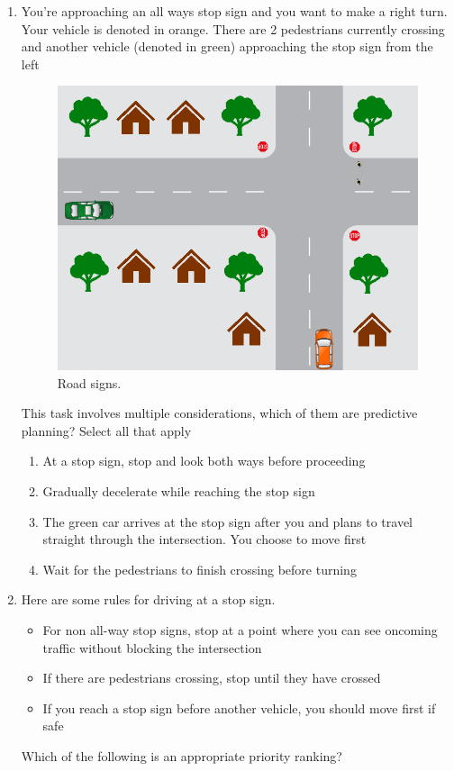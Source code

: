 \begin{enumerate}
\item You’re approaching an all ways stop sign and you want to make a right turn. Your vehicle is denoted in orange. There are 2 pedestrians currently crossing and another vehicle (denoted in green) approaching the stop sign from the left

\begin{figure}[!htb]
\begin{center}
\includegraphics[scale=0.280]{img/intro_self_driving/summary_question_scenario_2.png}
\end{center}
\caption{Road signs.}
\label{summary_question_scenario_2}
\end{figure}

This task involves multiple considerations, which of them are predictive planning? Select all that apply

\begin{enumerate}
\item At a stop sign, stop and look both ways before proceeding
\item Gradually decelerate while reaching the stop sign
\item The green car arrives at the stop sign after you and plans to travel straight through the intersection. 
You choose to move first
\item Wait for the pedestrians to finish crossing before turning
\end{enumerate}


\item Here are some rules for driving at a stop sign. 


\begin{itemize}
\item For non all-way stop signs, stop at a point where you can see oncoming traffic without blocking the intersection
\item If there are pedestrians crossing, stop until they have crossed
\item If you reach a stop sign before another vehicle, you should move first if safe
\end{itemize}

Which of the following is an appropriate priority ranking?

\end{enumerate}

